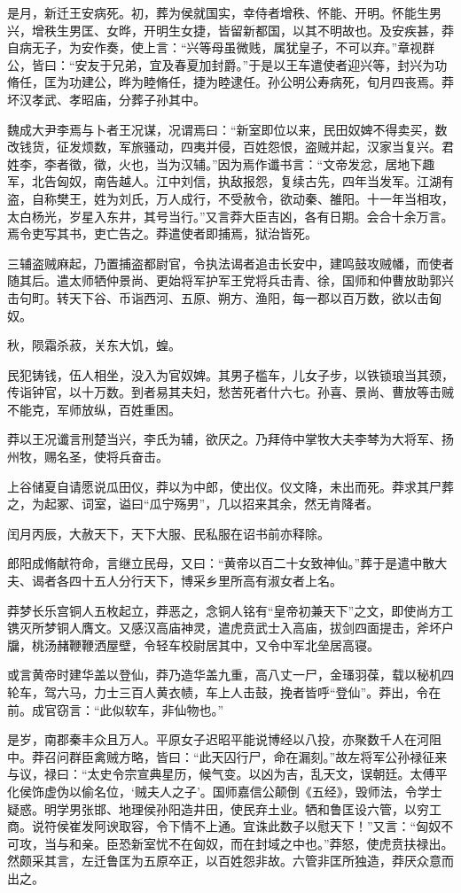 \documentclass[]{article}
\begin{document}
是月，新迁王安病死。初，葬为侯就国实，幸侍者增秩、怀能、开明。怀能生男兴，增秩生男匡、女晔，开明生女捷，皆留新都国，以其不明故也。及安疾甚，莽自病无子，为安作奏，使上言：``兴等母虽微贱，属犹皇子，不可以弃。''章视群公，皆曰：``安友于兄弟，宜及春夏加封爵。''于是以王车遣使者迎兴等，封兴为功脩任，匡为功建公，晔为睦脩任，捷为睦逮任。孙公明公寿病死，旬月四丧焉。莽坏汉孝武、孝昭庙，分葬子孙其中。

魏成大尹李焉与卜者王况谋，况谓焉曰：``新室即位以来，民田奴婢不得卖买，数改钱货，征发烦数，军旅骚动，四夷并侵，百姓怨恨，盗贼并起，汉家当复兴。君姓李，李者徵，徵，火也，当为汉辅。''因为焉作谶书言：``文帝发忿，居地下趣军，北告匈奴，南告越人。江中刘信，执敌报怨，复续古先，四年当发军。江湖有盗，自称樊王，姓为刘氏，万人成行，不受赦令，欲动秦、雒阳。十一年当相攻，太白杨光，岁星入东井，其号当行。''又言莽大臣吉凶，各有日期。会合十余万言。焉令吏写其书，吏亡告之。莽遣使者即捕焉，狱治皆死。

三辅盗贼麻起，乃置捕盗都尉官，令执法谒者追击长安中，建鸣鼓攻贼幡，而使者随其后。遣太师牺仲景尚、更始将军护军王党将兵击青、徐，国师和仲曹放助郭兴击句町。转天下谷、币诣西河、五原、朔方、渔阳，每一郡以百万数，欲以击匈奴。

秋，陨霜杀菽，关东大饥，蝗。

民犯铸钱，伍人相坐，没入为官奴婢。其男子槛车，儿女子步，以铁锁琅当其颈，传诣钟官，以十万数。到者易其夫妇，愁苦死者什六七。孙喜、景尚、曹放等击贼不能克，军师放纵，百姓重困。

莽以王况谶言刑楚当兴，李氏为辅，欲厌之。乃拜侍中掌牧大夫李棽为大将军、扬州牧，赐名圣，使将兵奋击。

上谷储夏自请愿说瓜田仪，莽以为中郎，使出仪。仪文降，未出而死。莽求其尸葬之，为起冢、词室，谥曰``瓜宁殇男''，几以招来其余，然无肯降者。

闰月丙辰，大赦天下，天下大服、民私服在诏书前亦释除。

郎阳成脩献符命，言继立民母，又曰：``黄帝以百二十女致神仙。''葬于是遣中散大夫、谒者各四十五人分行天下，博采乡里所高有淑女者上名。

莽梦长乐宫铜人五枚起立，莽恶之，念铜人铭有``皇帝初兼天下''之文，即使尚方工镌灭所梦铜人膺文。又感汉高庙神灵，遣虎贲武士入高庙，拔剑四面提击，斧坏户牖，桃汤赭鞭鞭洒屋壁，令轻车校尉居其中，又令中军北垒居高寝。

或言黄帝时建华盖以登仙，莽乃造华盖九重，高八丈一尸，金瑵羽葆，载以秘机四轮车，驾六马，力士三百人黄衣帻，车上人击鼓，挽者皆呼``登仙''。莽出，令在前。成官窃言：``此似软车，非仙物也。''

是岁，南郡秦丰众且万人。平原女子迟昭平能说博经以八投，亦聚数千人在河阻中。莽召问群臣禽贼方略，皆曰：``此天囚行尸，命在漏刻。''故左将军公孙禄征来与议，禄曰：``太史令宗宣典星历，候气变。以凶为吉，乱天文，误朝廷。太傅平化侯饰虚伪以偷名位，`贼夫人之子'。国师嘉信公颠倒《五经》，毁师法，令学士疑惑。明学男张邯、地理侯孙阳造井田，使民弃土业。牺和鲁匡设六管，以穷工商。说符侯崔发阿谀取容，令下情不上通。宜诛此数子以慰天下！''又言：``匈奴不可攻，当与和亲。臣恐新室忧不在匈奴，而在封域之中也。''莽怒，使虎贲扶禄出。然颇采其言，左迁鲁匡为五原卒正，以百姓怨非故。六管非匡所独造，莽厌众意而出之。
\end{document}
